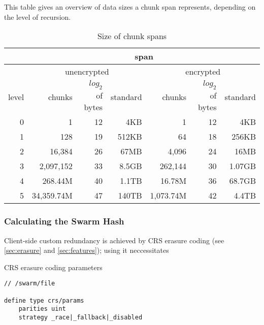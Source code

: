 
This table gives an overview of data sizes a chunk span represents, depending on the level of recursion.

\begin{table}[ht]
\begin{tabular}{|r||r|r|r||r|r|r|}
\hline
&\multicolumn{6}{|c|}{span}\\\hline
&\multicolumn{3}{|c|}{unencrypted}
&\multicolumn{3}{|c|}{encrypted}\\\hline
level & chunks & $\mathit{log}_2$ of bytes & standard & chunks & $\mathit{log}_2$ of bytes & standard \\
\hline\hline
0 & 1 & 12 & 4KB & 1 & 12 & 4KB \\\hline
1 & 128 & 19 & 512KB & 64 & 18 & 256KB \\\hline
2 & 16,384 & 26 & 67MB & 4,096 & 24 & 16MB \\\hline
3 & 2,097,152 &33 & 8.5GB & 262,144 &  30 & 1.07GB\\\hline
4 & 268.44M & 40  & 1.1TB & 16.78M & 36 & 68.7GB\\\hline
5 & 34,359.74M & 47 & 140TB & 1,073.74M & 42  & 4.4TB\\\hline
\end{tabular}
\caption{Size of chunk spans}
\end{table}




\subsubsection{Calculating the Swarm Hash}

Client-side custom redundancy is achieved by CRS erasure coding (see \ref{sec:erasure} and \ref{sec:features}); using it neccessitates 
\begin{definition}{CRS erasure coding parameters}\label{def:crs-params}
\begin{lstlisting}[language=buzz1]
// /swarm/file

define type crs/params 
    parities uint
    strategy _race|_fallback|_disabled
     
\end{lstlisting}
\end{definition}
      
